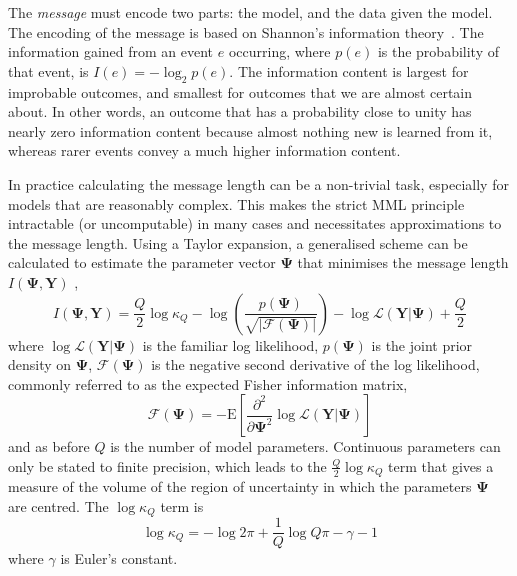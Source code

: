 \documentclass[twocolumn]{aastex62}
\newcommand{\vect}[1]{\boldsymbol{\mathbf{#1}}}
\renewcommand{\vec}[1]{\vect{#1}}
\newcommand{\data}{\textbf{Y}}
\newcommand{\vecdata}{\vec\data}
\newcommand{\likelihood}{\mathcal{L}}
\begin{document}
The \textit{message} must encode two parts: the model, and the data given the
model. The encoding of the message is based on Shannon's information theory~\citep{Shannon:1948}. 
The information gained from an event $e$ occurring, where $p(e)$ is the
probability of that event, is $I(e) = -\log_{2}{p(e)}$. The information content
is largest for improbable outcomes, and smallest for outcomes that we are 
almost certain about. In other words, an outcome that has a probability close
to unity has nearly zero information content because almost nothing new is learned from it,
whereas rarer events convey a much higher information content. 





In practice calculating the message length can be a non-trivial task, 
especially for models that are reasonably complex. This makes the strict MML
principle intractable (or uncomputable) in many cases and necessitates
approximations to the message length. Using a Taylor expansion, a generalised
scheme can be calculated to estimate the parameter vector $\vec\Psi$ that
minimises the message length ${I}(\vec\Psi,\vecdata)$ \citep{Wallace:1987},
\begin{equation}
	{I}(\vec\Psi,\vecdata) = \frac{Q}{2}\log\kappa_Q - \log\left(\frac{p(\vec\Psi)}{\sqrt{|\mathcal{F}(\vec\Psi)|}}\right) - \log\mathcal{L}\left(\vecdata|\vec\Psi\right) + \frac{Q}{2} \label{eq:mml} 
\end{equation}
\noindent{}where $\log\likelihood(\vecdata|\vec\Psi)$ is the familiar
log likelihood, $p(\vec\Psi)$ is the joint prior density on $\vec\Psi$,
$\mathcal{F}(\vec\Psi)$ is the negative second derivative of the log likelihood,
commonly referred to as the expected Fisher information matrix,
\begin{equation}
	\mathcal{F}(\vec\Psi) = -\textrm{E}\left[\frac{\partial^2}{\partial\vec\Psi^2}\log\likelihood(\vecdata|\vec\Psi)\right]
\end{equation}
\noindent{}and as before $Q$ is the number of model parameters.
Continuous parameters can only be stated to finite precision, which leads
to the $\frac{Q}{2}\log\kappa_Q$ term that gives a measure of the volume of the region of
uncertainty in which the parameters $\vec\Psi$ are centred. The $\log\kappa_Q$
term is
\begin{equation}
	\log\kappa_Q = -\log{2\pi} + \frac{1}{Q}\log{Q\pi} - \gamma - 1
\end{equation}
\noindent{}where $\gamma$ is Euler's constant.
\end{document}
